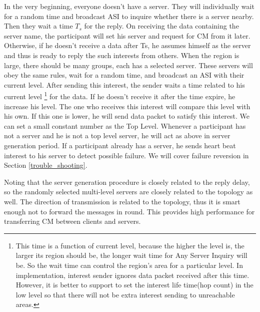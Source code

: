 \documentclass[conference]{IEEEtran}
\begin{document}
In the very beginning,
everyone doesn't have a server.
They will individually wait for a random time and broadcast
ASI to inquire whether there is a server nearby.
Then they wait a time $T_s$ for the reply.
On receiving the data containing the server name,
the participant will set his server and request for CM from it later.
Otherwise, if he doesn't receive a data after Ts,
he assumes himself as the server and thus is ready to reply the such interests from others.
When the region is large, there should be many groups, each has a selected server.
These servers will obey the same rules, wait for a random time,
and broadcast an ASI with their current level.
After sending this interest,
the sender waits a time related to his current level
\footnote{This time is a function of current level, because the higher the level is,
the larger its region should be, the longer wait time for Any Server Inquiry will be.
So the wait time can control the region's area for a particular level.
In implementation, interest sender ignores data packet received after this time.
However, it is better to support to set the interest life time(hop count) in the low level
so that there will not be extra interest sending to unreachable areas.} for the data.
If he doesn't receive it after the time expire, he increase his level.
The one who receives this interest will compare this level with his own.
If this one is lower, he will send data packet to satisfy this interest.
We can set a small constant number as the Top Level.
Whenever a participant has not a server and he is not a top level server,
he will act as above in server generation period.
If a participant already has a server,
he sends heart beat interest to his server to detect possible failure.
We will cover failure reversion in Section \ref{trouble_shooting}.

Noting that the server generation procedure is closely related to the reply delay,
so the randomly selected multi-level servers are closely related to the topology as well.
The direction of transmission is related to the topology,
thus it is smart enough not to forward the messages in round.
This provides high performance for transferring CM between clients and servers.
\end{document}
